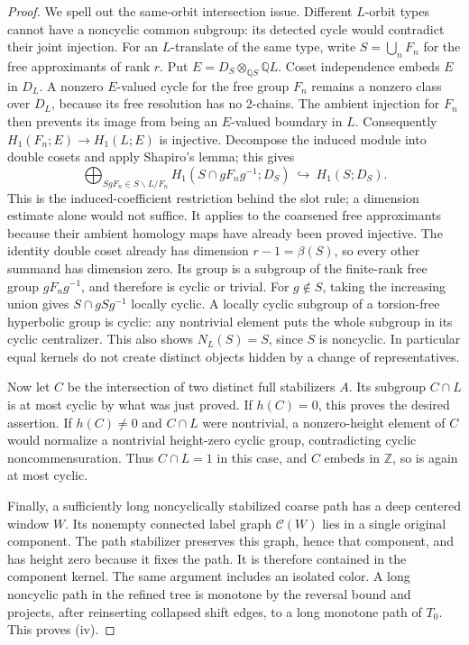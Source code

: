 \begin{proof}
We spell out the same-orbit intersection issue.  Different $L$-orbit
types cannot have a noncyclic common subgroup: its detected cycle would
contradict their joint injection.  For an $L$-translate of the same type,
write $S=\bigcup_n F_n$ for the free approximants of rank $r$.  Put
$E=D_S\otimes_{\mathbb Q S}\mathbb Q L$.  Coset independence embeds $E$
in $D_L$.  A nonzero $E$-valued cycle for the free group $F_n$ remains a
nonzero class over $D_L$, because its free resolution has no 2-chains.
The ambient injection for $F_n$ then prevents its image from being an
$E$-valued boundary in $L$.  Consequently
$H_1(F_n;E)\to H_1(L;E)$ is injective.  Decompose the induced module into
double cosets and apply Shapiro's lemma; this gives
\[
 \bigoplus_{SgF_n\in S\backslash L/F_n}
 H_1(S\cap gF_ng^{-1};D_S)\ \hookrightarrow\ H_1(S;D_S).
\]
This is the induced-coefficient restriction behind the slot rule;
a dimension estimate alone would not suffice.  It applies to the
coarsened free approximants because their ambient homology maps have
already been proved injective.  The identity double coset
already has dimension $r-1=\beta(S)$, so every other summand has dimension
zero.  Its group is a subgroup of the finite-rank free group $gF_ng^{-1}$,
and therefore is cyclic or trivial.  For $g\notin S$, taking the increasing
union gives $S\cap gSg^{-1}$ locally cyclic.  A locally cyclic subgroup
of a torsion-free hyperbolic group is cyclic: any nontrivial element
puts the whole subgroup in its cyclic centralizer.  This also shows
$N_L(S)=S$, since $S$ is noncyclic.  In particular equal kernels do not
create distinct objects hidden by a change of representatives.

Now let $C$ be the intersection of two distinct full stabilizers $A$.
Its subgroup $C\cap L$ is at most cyclic by what was just proved.  If
$h(C)=0$, this proves the desired assertion.  If $h(C)\ne0$ and
$C\cap L$ were nontrivial, a nonzero-height element of $C$ would normalize
a nontrivial height-zero cyclic group, contradicting cyclic
noncommensuration.  Thus $C\cap L=1$ in this case, and $C$ embeds in
$\mathbb Z$, so is again at most cyclic.

Finally, a sufficiently long noncyclically stabilized coarse path has a
deep centered window $W$.  Its nonempty connected label graph
$\mathcal C(W)$ lies in a single original component.  The path stabilizer
preserves this graph, hence that component, and has height zero because
it fixes the path.  It is therefore contained in the component kernel.
The same argument includes an isolated color.  A long noncyclic path in
the refined tree is monotone by the reversal bound and projects, after
reinserting collapsed shift edges, to a long monotone path of $T_0$.
This proves (iv).


\end{proof}
